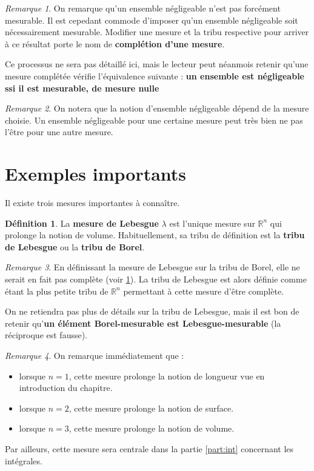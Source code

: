 \documentclass[french]{report}
\theoremstyle{plain}
\theoremstyle{definition}
\newtheorem{defi}{Définition}[section]
\theoremstyle{remark}
\newtheorem{rem}{Remarque}[section]
\newcommand\itemb{\item[$\bullet$]}
\begin{document}
\begin{rem}
  \label{rem:completion}
  On remarque qu'un ensemble négligeable n'est pas forcément mesurable.
  Il est cepedant commode d'imposer qu'un ensemble négligeable soit nécessairement mesurable.
  Modifier une mesure et la tribu respective pour arriver à ce résultat porte le nom de \textbf{complétion d'une mesure}.

  Ce processus ne sera pas détaillé ici, mais le lecteur peut néanmois retenir qu'une mesure complétée vérifie l'équivalence suivante : \textbf{un ensemble est négligeable ssi il est mesurable, de mesure nulle}
\end{rem}

\begin{rem}
  On notera que la notion d'ensemble négligeable dépend de la mesure choisie.
  Un ensemble négligeable pour une certaine mesure peut très bien ne pas l'être pour une autre mesure.
\end{rem}


\section{Exemples importants}
Il existe trois mesures importantes à connaître.

\begin{defi}
  La \textbf{mesure de Lebesgue} $\lambda$ est l'unique mesure sur $\mathbb{R}^n$ qui prolonge la notion de volume.
  Habituellement, sa tribu de définition est la \textbf{tribu de Lebesgue} ou la \textbf{tribu de Borel}.
\end{defi}

\begin{rem}
  En définissant la mesure de Lebesgue sur la tribu de Borel, elle ne serait en fait pas complète (voir \ref{rem:completion}).
  La tribu de Lebesgue est alors définie comme étant la plus petite tribu de $\mathbb{R}^n$ permettant à cette mesure d'être complète.
  
  On ne retiendra pas plus de détails sur la tribu de Lebesgue, mais il est bon de retenir qu'\textbf{un élément Borel-mesurable est Lebesgue-mesurable} (la réciproque est fausse).
\end{rem}

\begin{rem}
  On remarque immédiatement que :
  \begin{itemize}
    \itemb lorsque $n=1$, cette mesure prolonge la notion de longueur vue en introduction du chapitre.
    \itemb lorsque $n=2$, cette mesure prolonge la notion de surface.
    \itemb lorsque $n=3$, cette mesure prolonge la notion de volume.
  \end{itemize}

  Par ailleurs, cette mesure sera centrale dans la partie \ref{part:int} concernant les intégrales.
\end{rem}
\end{document}
